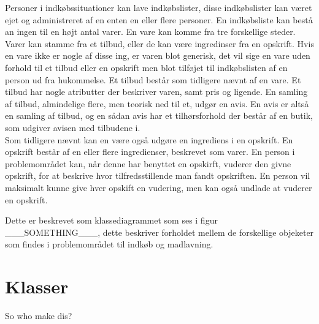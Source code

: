 Personer i indkøbssituationer kan lave indkøbslister, disse indkøbslister kan været ejet og administreret af en enten en eller flere personer. 
En indkøbsliste kan bestå an ingen til en højt antal varer.
En vare kan komme fra tre forskellige steder.
Varer kan stamme fra et tilbud, eller de kan være ingredinser fra en opskrift. 
Hvis en vare ikke er nogle af disse ing, er varen blot generisk, det vil sige en vare uden forhold til et tilbud eller en opskrift men blot tilføjet til indkøbslisten af en person ud fra hukommelse.
Et tilbud består som tidligere nævnt af en vare.
Et tilbud har nogle atributter der beskriver varen, samt pris og ligende.
En samling af tilbud, almindelige flere, men teorisk ned til et, udgør en avis. 
En avis er altså en samling af tilbud, og en sådan avis har et tilhørsforhold der består af en butik, som udgiver avisen med tilbudene i.\\
Som tidligere nævnt kan en være også udgøre en ingrediens i en opskrift.
En opskrift består af en eller flere ingredienser, beskrevet som varer.
En person i problemområdet kan, når denne har benyttet en opskirft, vuderer den givne opskrift, for at beskrive hvor tilfredsstillende man fandt opskriften.
En person vil maksimalt kunne give hver opskift en vudering, men kan også undlade at vuderer en opskrift.

Dette er beskrevet som klassediagrammet som ses i figur ___SOMETHING___, dette beskriver forholdet mellem de forskellige objeketer som findes i problemområdet til indkøb og madlavning.

\section{Klasser}
So who make dis?

